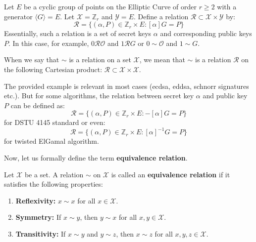 \documentclass[../lecture-notes.tex]{subfiles}
\begin{document}
\begin{example}
    Let $E$ be a cyclic group of points on the Elliptic Curve of order $r \geq 2$ with a generator $\langle G \rangle = E$. Let $\mathcal{X} = \mathbb{Z}_r$ and $\mathcal{Y} = E$. Define a relation $\mathcal{R} \subset \mathcal{X} \times \mathcal{Y}$ by:
    \begin{equation}
        \mathcal{R} = \{(\alpha, P) \in \mathbb{Z}_r \times E: [\alpha]G = P\}
    \end{equation}
    Essentially, such a relation is a set of secret keys $\alpha$ and corresponding public keys $P$. In this case, for example, $0\mathcal{R}\mathcal{O}$ and $1\mathcal{R}G$ or $0 \sim \mathcal{O}$ and $1 \sim G$.
\end{example}

\begin{remark}
    When we say that $\sim$ is a relation on a set $\mathcal{X}$, we mean that $\sim$ is a relation $\mathcal{R}$ on the following Cartesian product: $\mathcal{R} \subset \mathcal{X} \times \mathcal{X}$.
\end{remark}

\begin{remark}
    The provided example is relevant in most cases (ecdsa, eddsa, schnorr signatures etc.). But for some algorithms, the relation between secret key $\alpha$ and public key $P$ can be defined as:
    \begin{equation}
        \mathcal{R} = \{(\alpha, P) \in \mathbb{Z}_r \times E: -[\alpha]G = P\}
    \end{equation} 
    for DSTU 4145 standard or even:
    \begin{equation}
        \mathcal{R} = \{(\alpha, P) \in \mathbb{Z}_r \times E: [\alpha]^{-1}G = P\}
    \end{equation}
    for twisted ElGamal algorithm.
\end{remark}

Now, let us formally define the term \textbf{equivalence relation}.

\begin{definition}
    Let $\mathcal{X}$ be a set. A relation $\sim$ on $\mathcal{X}$ is called an \textbf{equivalence relation} if it satisfies the following properties:
    \begin{enumerate}
        \item \textbf{Reflexivity:} $x \sim x$ for all $x \in \mathcal{X}$.
        \item \textbf{Symmetry:} If $x \sim y$, then $y \sim x$ for all $x,y \in \mathcal{X}$.
        \item \textbf{Transitivity:} If $x \sim y$ and $y \sim z$, then $x \sim z$ for all $x,y,z \in \mathcal{X}$.
    \end{enumerate}
\end{definition}
\end{document}
